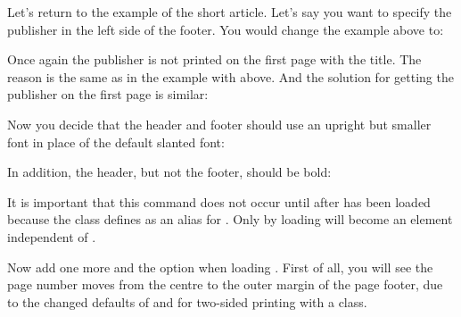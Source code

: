 \begin{Example}
  Let's return to the example of the short article. Let's say you want to
  specify the publisher in the left side of the footer. You would change the
  example above to:
  Once again the publisher is not printed on the first page with the title.
  The reason is the same as in the example with
   above. And the solution for getting the
  publisher on the first page is similar:
\begin{lstcode}
\end{lstcode}
  Now you decide%
   that the header and footer should use an
  upright but smaller font in place of the default slanted font:
\begin{lstcode}
\end{lstcode}
  In addition, the header, but not the footer, should be bold:
\begin{lstcode}
\end{lstcode}
  It is important that this command does not occur until
  after  has been loaded because the \KOMAScript{}
  class defines  as an alias for 
  . Only by loading
   will 
  become an element independent of
  .

  Now add one more  and the
   option
  when   loading . First of all, you will see the page number
  moves from the centre to the outer margin of the page footer, due to the
  changed defaults of  and
   for two-sided printing with
  a \KOMAScript{} class.


\end{Example}
